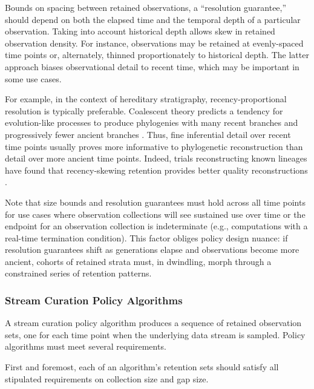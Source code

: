 Bounds on spacing between retained observations, a ``resolution guarantee,'' should depend on both the elapsed time and the temporal depth of a particular observation.
Taking into account historical depth allows skew in retained observation density.
For instance, observations may be retained at evenly-spaced time points or, alternately, thinned proportionately to historical depth.
The latter approach biases observational detail to recent time, which may be important in some use cases.

For example, in the context of hereditary stratigraphy, recency-proportional resolution is typically preferable.
Coalescent theory predicts a tendency for evolution-like processes to produce phylogenies with many recent branches and progressively fewer ancient branches \citep{nordborgCoalescentTheory2019, berestyckiRecentProgressCoalescent2009}.
Thus, fine inferential detail over recent time points usually proves more informative to phylogenetic reconstruction than detail over more ancient time points.
Indeed, trials reconstructing known lineages have found that recency-skewing retention provides better quality reconstructions \citep{moreno2022hereditary}.

Note that size bounds and resolution guarantees must hold across all time points for use cases where observation collections will see sustained use over time or the endpoint for an observation collection is indeterminate (e.g., computations with a real-time termination condition).
This factor obliges policy design nuance: if resolution guarantees shift as generations elapse and observations become more ancient, cohorts of retained strata must, in dwindling, morph through a constrained series of retention patterns.

\subsubsection{Stream Curation Policy Algorithms}

A stream curation policy algorithm produces a sequence of retained observation sets, one for each time point when the underlying data stream is sampled.
Policy algorithms must meet several requirements.

First and foremost, each of an algorithm's retention sets should satisfy all stipulated requirements on collection size and gap size.

